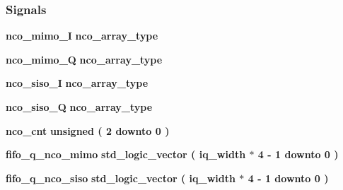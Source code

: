 \subsubsection*{Signals}
 \begin{DoxyCompactItemize}
\item 
{\bf nco\+\_\+mimo\+\_\+I} {\bfseries {\bfseries {\bf nco\+\_\+array\+\_\+type}} \textcolor{vhdlchar}{ }} 
\item 
{\bf nco\+\_\+mimo\+\_\+Q} {\bfseries {\bfseries {\bf nco\+\_\+array\+\_\+type}} \textcolor{vhdlchar}{ }} 
\item 
{\bf nco\+\_\+siso\+\_\+I} {\bfseries {\bfseries {\bf nco\+\_\+array\+\_\+type}} \textcolor{vhdlchar}{ }} 
\item 
{\bf nco\+\_\+siso\+\_\+Q} {\bfseries {\bfseries {\bf nco\+\_\+array\+\_\+type}} \textcolor{vhdlchar}{ }} 
\item 
{\bf nco\+\_\+cnt} {\bfseries \textcolor{comment}{unsigned}\textcolor{vhdlchar}{ }\textcolor{vhdlchar}{(}\textcolor{vhdlchar}{ }\textcolor{vhdlchar}{ } \textcolor{vhdldigit}{2} \textcolor{vhdlchar}{ }\textcolor{keywordflow}{downto}\textcolor{vhdlchar}{ }\textcolor{vhdlchar}{ } \textcolor{vhdldigit}{0} \textcolor{vhdlchar}{ }\textcolor{vhdlchar}{)}\textcolor{vhdlchar}{ }} 
\item 
{\bf fifo\+\_\+q\+\_\+nco\+\_\+mimo} {\bfseries \textcolor{comment}{std\+\_\+logic\+\_\+vector}\textcolor{vhdlchar}{ }\textcolor{vhdlchar}{(}\textcolor{vhdlchar}{ }\textcolor{vhdlchar}{ }\textcolor{vhdlchar}{ }\textcolor{vhdlchar}{ }{\bfseries {\bf iq\+\_\+width}} \textcolor{vhdlchar}{$\ast$}\textcolor{vhdlchar}{ } \textcolor{vhdldigit}{4} \textcolor{vhdlchar}{-\/}\textcolor{vhdlchar}{ } \textcolor{vhdldigit}{1} \textcolor{vhdlchar}{ }\textcolor{keywordflow}{downto}\textcolor{vhdlchar}{ }\textcolor{vhdlchar}{ } \textcolor{vhdldigit}{0} \textcolor{vhdlchar}{ }\textcolor{vhdlchar}{)}\textcolor{vhdlchar}{ }} 
\item 
{\bf fifo\+\_\+q\+\_\+nco\+\_\+siso} {\bfseries \textcolor{comment}{std\+\_\+logic\+\_\+vector}\textcolor{vhdlchar}{ }\textcolor{vhdlchar}{(}\textcolor{vhdlchar}{ }\textcolor{vhdlchar}{ }\textcolor{vhdlchar}{ }\textcolor{vhdlchar}{ }{\bfseries {\bf iq\+\_\+width}} \textcolor{vhdlchar}{$\ast$}\textcolor{vhdlchar}{ } \textcolor{vhdldigit}{4} \textcolor{vhdlchar}{-\/}\textcolor{vhdlchar}{ } \textcolor{vhdldigit}{1} \textcolor{vhdlchar}{ }\textcolor{keywordflow}{downto}\textcolor{vhdlchar}{ }\textcolor{vhdlchar}{ } \textcolor{vhdldigit}{0} \textcolor{vhdlchar}{ }\textcolor{vhdlchar}{)}\textcolor{vhdlchar}{ }} 
\end{DoxyCompactItemize}


